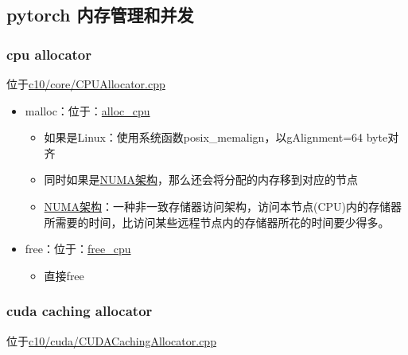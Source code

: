 \subsection{pytorch 内存管理和并发}

\subsubsection{cpu allocator}

位于\href{https://github.com/pytorch/pytorch/blob/master/c10/core/CPUAllocator.cpp}{c10/core/CPUAllocator.cpp}

\begin{itemize}
\tightlist
\item
  malloc：位于：\href{https://github.com/pytorch/pytorch/blob/master/c10/core/CPUAllocator.cpp\#L40}{alloc\_cpu}

  \begin{itemize}
  \tightlist
  \item
    如果是Linux：使用系统函数posix\_memalign，以gAlignment=64 byte对齐
  \item
    同时如果是\href{http://www.cnblogs.com/shanyou/archive/2009/12/26/1633052.html}{NUMA架构}，那么还会将分配的内存移到对应的节点
  \item
    \href{http://www.cnblogs.com/shanyou/archive/2009/12/26/1633052.html}{NUMA架构}：一种非一致存储器访问架构，访问本节点(CPU)内的存储器所需要的时间，比访问某些远程节点内的存储器所花的时间要少得多。
  \end{itemize}
\item
  free：位于：\href{https://github.com/pytorch/pytorch/blob/master/c10/core/CPUAllocator.cpp\#L79}{free\_cpu}

  \begin{itemize}
  \tightlist
  \item
    直接free
  \end{itemize}
\end{itemize}

\subsubsection{cuda caching allocator}

位于\href{https://github.com/pytorch/pytorch/blob/master/c10/cuda/CUDACachingAllocator.cpp}{c10/cuda/CUDACachingAllocator.cpp}

